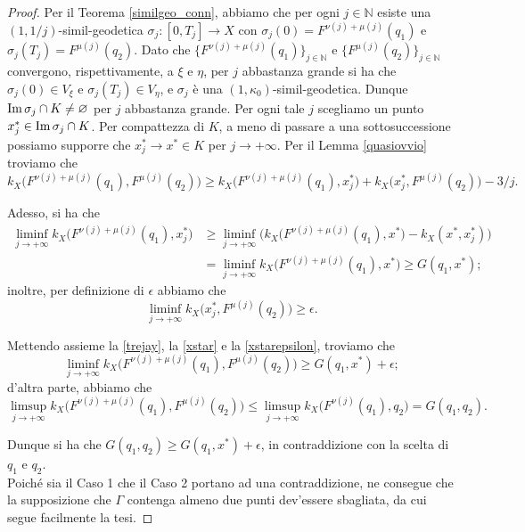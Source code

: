 \begin{proof}
    Per il Teorema \ref{similgeo_conn}, abbiamo che per ogni $j\in\mathbb{N}$ esiste una $(1,1/j)$-simil-geodetica $\sigma_j:[0,T_j]\longrightarrow X$ con $\sigma_j(0)=F^{\nu(j)+\mu(j)}(q_1)$ e $\sigma_j(T_j)=F^{\mu(j)}(q_2)$. Dato che $\{F^{\nu(j)+\mu(j)}(q_1)\}_{j\in\mathbb{N}}$ e $\{F^{\mu(j)}(q_2)\}_{j\in\mathbb{N}}$ convergono, rispettivamente, a $\xi$ e $\eta$, per $j$ abbastanza grande si ha che $\sigma_j(0)\in V_\xi$ e $\sigma_j(T_j)\in V_\eta$, e $\sigma_j$ è una $(1,\kappa_0)$-simil-geodetica. Dunque $\operatorname{Im}{\sigma_j}\cap K\not=\varnothing$ per $j$ abbastanza grande. Per ogni tale $j$ scegliamo un punto $x_j^*\in \operatorname{Im}{\sigma_j}\cap K$. Per compattezza di $K$, a meno di passare a una sottosuccessione possiamo supporre che $x_j^* \longrightarrow x^* \in K$ per $j\longrightarrow+\infty$. Per il Lemma \ref{quasiovvio} troviamo che
    \begin{equation} \label{trejay}
        k_X\big(F^{\nu(j)+\mu(j)}(q_1),F^{\mu(j)}(q_2)\big) \ge k_X\big(F^{\nu(j)+\mu(j)}(q_1),x_j^*\big)+k_X\big(x_j^*,F^{\mu(j)}(q_2)\big)-3/j.
    \end{equation}

    Adesso, si ha che
    \begin{equation} \label{xstar}
        \begin{aligned}
            \liminf_{j\longrightarrow+\infty}k_X\big(F^{\nu(j)+\mu(j)}(q_1),x_j^*\big) &\ge \liminf_{j\longrightarrow+\infty} \Big(k_X\big(F^{\nu(j)+\mu(j)}(q_1),x^*\big)-k_X(x^*,x_j^*)\Big)\\
            &=\liminf_{j\longrightarrow+\infty}k_X\big(F^{\nu(j)+\mu(j)}(q_1),x^*\big) \ge G(q_1,x^*);
        \end{aligned}
    \end{equation}
    inoltre, per definizione di $\epsilon$ abbiamo che
    \begin{equation} \label{xstarepsilon}
        \liminf_{j\longrightarrow+\infty}k_X\big(x_j^*,F^{\mu(j)}(q_2)\big) \ge \epsilon.
    \end{equation}

    Mettendo assieme la \eqref{trejay}, la \eqref{xstar} e la \eqref{xstarepsilon}, troviamo che
    $$\liminf_{j\longrightarrow+\infty}k_X\big(F^{\nu(j)+\mu(j)}(q_1),F^{\mu(j)}(q_2)\big) \ge G(q_1,x^*)+\epsilon;$$
    d'altra parte, abbiamo che
    $$\limsup_{j\longrightarrow+\infty}k_X\big(F^{\nu(j)+\mu(j)}(q_1),F^{\mu(j)}(q_2)\big) \le \limsup_{j\longrightarrow+\infty}k_X\big(F^{\nu(j)}(q_1),q_2\big)=G(q_1,q_2).$$

    Dunque si ha che $G(q_1,q_2) \ge G(q_1,x^*)+\epsilon$, in contraddizione con la scelta di $q_1$ e $q_2$. \\

    Poiché sia il Caso 1 che il Caso 2 portano ad una contraddizione, ne consegue che la supposizione che $\Gamma$ contenga almeno due punti dev'essere sbagliata, da cui segue facilmente la tesi.
\end{proof}

